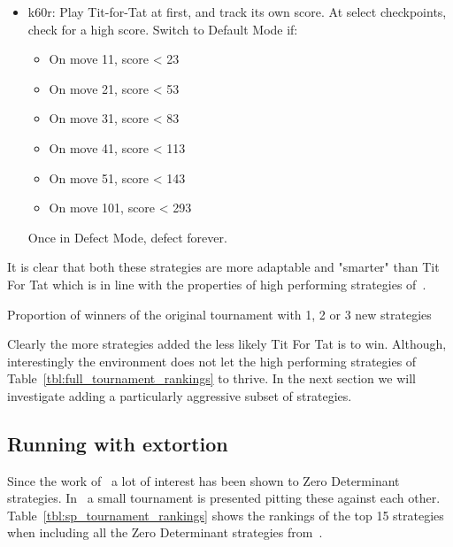 \documentclass{article}
\begin{document}
\begin{itemize}
    \item k60r: 
Play Tit-for-Tat at first, and track its own score.  At select checkpoints,
check for a high score.  Switch to Default Mode if:

        \begin{itemize}
            \item On move 11, score < 23
            \item On move 21, score < 53
            \item On move 31, score < 83
            \item On move 41, score < 113
            \item On move 51, score < 143
            \item On move 101, score < 293
        \end{itemize}

Once in Defect Mode, defect forever.
\end{itemize}

It is clear that both these strategies are more adaptable and "smarter" than Tit
For Tat which is in line with the properties of high performing strategies
of~\cite{glynatsi2024properties}.

\begin{table}[!hbtp]
        \centering
        
        \caption{Proportion of winners of the original tournament with 1, 2 or 3
        new strategies}
        \label{tbl:alternate_extra_strategy_tournament_winner_proportion}
\end{table}

Clearly the more strategies added the less likely Tit For Tat is to win.
Although, interestingly the environment does not let the high performing
strategies of Table~\ref{tbl:full_tournament_rankings} to thrive. In the
next section we will investigate adding a particularly aggressive subset of
strategies.

\subsection{Running with extortion}\label{sec:run_with_stewart_plotkin}

Since the work of~\cite{Press2012} a lot of interest has been shown to Zero
Determinant strategies. In~\cite{Stewart2012} a small tournament is presented
pitting these against each other. Table~\ref{tbl:sp_tournament_rankings}
shows the rankings of the top 15 strategies when including all the Zero
Determinant strategies from~\cite{Stewart2012}.
\end{document}
